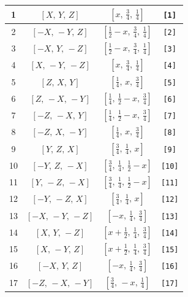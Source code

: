 \documentclass[fleqn,8pt]{jsarticle}
\begin{document}
\begin{longtable}{cccc}
1 & $\left[ X,\, Y,\, Z \right]$ & $\left[ x,\, \frac{3}{4},\, \frac{1}{4} \right]$ & {\tt [1]} \\ \hline
2 & $\left[ - X,\, - Y,\, Z \right]$ & $\left[ \frac{1}{2} - x,\, \frac{3}{4},\, \frac{1}{4} \right]$ & {\tt [2]} \\ \hline
3 & $\left[ - X,\, Y,\, - Z \right]$ & $\left[ \frac{1}{2} - x,\, \frac{3}{4},\, \frac{1}{4} \right]$ & {\tt [3]} \\ \hline
4 & $\left[ X,\, - Y,\, - Z \right]$ & $\left[ x,\, \frac{3}{4},\, \frac{1}{4} \right]$ & {\tt [4]} \\ \hline
5 & $\left[ Z,\, X,\, Y \right]$ & $\left[ \frac{1}{4},\, x,\, \frac{3}{4} \right]$ & {\tt [5]} \\ \hline
6 & $\left[ Z,\, - X,\, - Y \right]$ & $\left[ \frac{1}{4},\, \frac{1}{2} - x,\, \frac{3}{4} \right]$ & {\tt [6]} \\ \hline
7 & $\left[ - Z,\, - X,\, Y \right]$ & $\left[ \frac{1}{4},\, \frac{1}{2} - x,\, \frac{3}{4} \right]$ & {\tt [7]} \\ \hline
8 & $\left[ - Z,\, X,\, - Y \right]$ & $\left[ \frac{1}{4},\, x,\, \frac{3}{4} \right]$ & {\tt [8]} \\ \hline
9 & $\left[ Y,\, Z,\, X \right]$ & $\left[ \frac{3}{4},\, \frac{1}{4},\, x \right]$ & {\tt [9]} \\ \hline
10 & $\left[ - Y,\, Z,\, - X \right]$ & $\left[ \frac{3}{4},\, \frac{1}{4},\, \frac{1}{2} - x \right]$ & {\tt [10]} \\ \hline
11 & $\left[ Y,\, - Z,\, - X \right]$ & $\left[ \frac{3}{4},\, \frac{1}{4},\, \frac{1}{2} - x \right]$ & {\tt [11]} \\ \hline
12 & $\left[ - Y,\, - Z,\, X \right]$ & $\left[ \frac{3}{4},\, \frac{1}{4},\, x \right]$ & {\tt [12]} \\ \hline
13 & $\left[ - X,\, - Y,\, - Z \right]$ & $\left[ - x,\, \frac{1}{4},\, \frac{3}{4} \right]$ & {\tt [13]} \\ \hline
14 & $\left[ X,\, Y,\, - Z \right]$ & $\left[ x + \frac{1}{2},\, \frac{1}{4},\, \frac{3}{4} \right]$ & {\tt [14]} \\ \hline
15 & $\left[ X,\, - Y,\, Z \right]$ & $\left[ x + \frac{1}{2},\, \frac{1}{4},\, \frac{3}{4} \right]$ & {\tt [15]} \\ \hline
16 & $\left[ - X,\, Y,\, Z \right]$ & $\left[ - x,\, \frac{1}{4},\, \frac{3}{4} \right]$ & {\tt [16]} \\ \hline
17 & $\left[ - Z,\, - X,\, - Y \right]$ & $\left[ \frac{3}{4},\, - x,\, \frac{1}{4} \right]$ & {\tt [17]} \\ \hline

\end{longtable}
\end{document}
